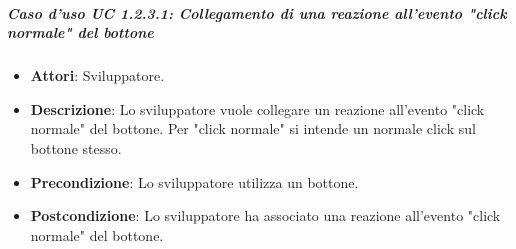 \subparagraph{Caso d'uso UC 1.2.3.1: Collegamento di una reazione all'evento "click normale" del bottone}

\FloatBarrier
\begin{itemize}
\item\textbf{Attori}: Sviluppatore.
\item\textbf{Descrizione}: Lo sviluppatore vuole collegare un reazione all'evento "click normale" del bottone. Per "click normale" si intende un normale click sul bottone stesso.
\item\textbf{Precondizione}: Lo sviluppatore utilizza un bottone.
\item\textbf{Postcondizione}: Lo sviluppatore ha associato una reazione all'evento "click normale" del bottone.
\end{itemize}
